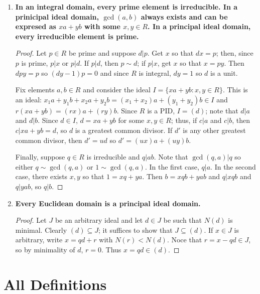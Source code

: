 \documentclass[12pt, a4paper]{article}
\theoremstyle{nonumberplain}
\newtheorem{proof}{Proof}
\begin{document}
\begin{enumerate}
\begin{proof}
            Otherwise, we assume $R$ has no zero divisors.
            Let $a\neq 0$, so $\{0\}\neq Ra\triangleleq R$ and $Ra=R$.
            Since $a\in R$, get $e\in R$ so that $ea=a$.
            Then if $b$ is arbitrary, $ba=bea$ so $(b-be)a=0$ and since $a\neq 0$, $b=be$.
            Since $R$ is commutative, $be=eb=b$ so $e\in R$ is an identity element
            Now if $x\neq 0$ is arbitrary, $Rx=R$ so there exists $y\in R$ so $yx=e$, so every $x$ has an inverse.
            Thus $R$ is a field.
        \end{proof}
    \item \textbf{In an integral domain, every prime element is irreducible.
            In a prinicipal ideal domain, $\gcd(a,b)$ always exists and can be expresed as $xa+yb$ with some $x,y\in R$.
            In a principal ideal domain, every irreducible element is prime.
        }
        \begin{proof}
            Let $p\in R$ be prime and suppose $d|p$.
            Get $x$ so that $dx=p$; then, since $p$ is prime, $p|x$ or $p|d$.
            If $p|d$, then $p\sim d$; if $p|x$, get $x$ so that $x=py$.
            Then $dpy=p$ so $(dy-1)p=0$ and since $R$ is integral, $dy=1$ so $d$ is a unit.
            
            Fix elements $a,b\in R$ and consider the ideal $I=\{xa+yb:x,y\in R\}$.
            This is an ideal: $x_1a+y_1b+x_2a+y_2b=(x_1+x_2)a+(y_1+y_2)b\in I$ and $r(xa+yb)=(rx)a+(ry)b$.
            Since $R$ is a PID, $I=(d)$; note that $d|a$ and $d|b$.
            Since $d\in I$, $d=xa+yb$ for some $x,y\in R$; thus, if $c|a$ and $c|b$, then $c|xa+yb=d$, so $d$ is a greatest common divisor.
            If $d'$ is any other greatest common divisor, then $d'=ud$ so $d'=(ux)a+(uy)b$.

            Finally, suppose $q\in R$ is irreducible and $q|ab$.
            Note that $\gcd(q,a)|q$ so either $q\sim\gcd(q,a)$ or $1\sim\gcd(q,a)$.
            In the first case, $q|a$.
            In the second case, there exists $x,y$ so that $1=xq+ya$.
            Then $b=xqb+yab$ and $q|xqb$ and $q|yab$, so $q|b$.
        \end{proof}
    \item \textbf{Every Euclidean domain is a principal ideal domain.}
        \begin{proof}
            Let $J$ be an arbitrary ideal and let $d\in J$ be such that $N(d)$ is minimal.
            Clearly $(d)\subseteq J$; it suffices to show that $J\subseteq (d)$.
            If $x\in J$ is arbitrary, write $x=qd+r$ with $N(r)<N(d)$.
            Noce that $r=x-qd\in J$, so by minimality of $d$, $r=0$.
            Thus $x=qd\in (d)$.
        \end{proof}
\end{enumerate}
\section{All Definitions}
\end{document}
